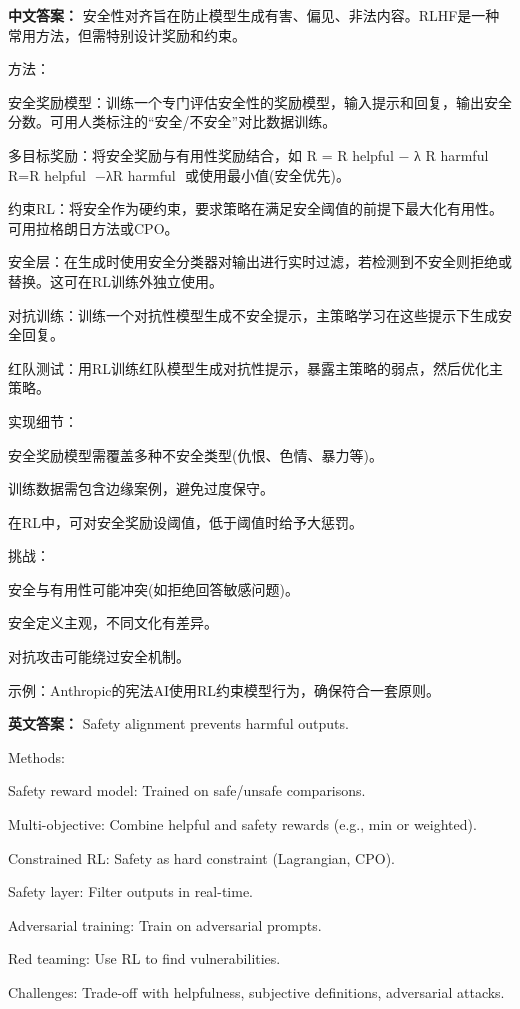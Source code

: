 \documentclass[10pt,a4paper]{ctexart}
\begin{document}
\textbf{中文答案：}
安全性对齐旨在防止模型生成有害、偏见、非法内容。RLHF是一种常用方法，但需特别设计奖励和约束。

方法：

安全奖励模型：训练一个专门评估安全性的奖励模型，输入提示和回复，输出安全分数。可用人类标注的“安全/不安全”对比数据训练。

多目标奖励：将安全奖励与有用性奖励结合，如 
R
=
R
helpful
−
λ
R
harmful
R=R 
helpful
​
 −λR 
harmful
​
  或使用最小值(安全优先)。

约束RL：将安全作为硬约束，要求策略在满足安全阈值的前提下最大化有用性。可用拉格朗日方法或CPO。

安全层：在生成时使用安全分类器对输出进行实时过滤，若检测到不安全则拒绝或替换。这可在RL训练外独立使用。

对抗训练：训练一个对抗性模型生成不安全提示，主策略学习在这些提示下生成安全回复。

红队测试：用RL训练红队模型生成对抗性提示，暴露主策略的弱点，然后优化主策略。

实现细节：

安全奖励模型需覆盖多种不安全类型(仇恨、色情、暴力等)。

训练数据需包含边缘案例，避免过度保守。

在RL中，可对安全奖励设阈值，低于阈值时给予大惩罚。

挑战：

安全与有用性可能冲突(如拒绝回答敏感问题)。

安全定义主观，不同文化有差异。

对抗攻击可能绕过安全机制。

示例：Anthropic的宪法AI使用RL约束模型行为，确保符合一套原则。

\textbf{英文答案：}
Safety alignment prevents harmful outputs.

Methods:

Safety reward model: Trained on safe/unsafe comparisons.

Multi-objective: Combine helpful and safety rewards (e.g., min or weighted).

Constrained RL: Safety as hard constraint (Lagrangian, CPO).

Safety layer: Filter outputs in real-time.

Adversarial training: Train on adversarial prompts.

Red teaming: Use RL to find vulnerabilities.

Challenges: Trade-off with helpfulness, subjective definitions, adversarial attacks.
\end{document}
